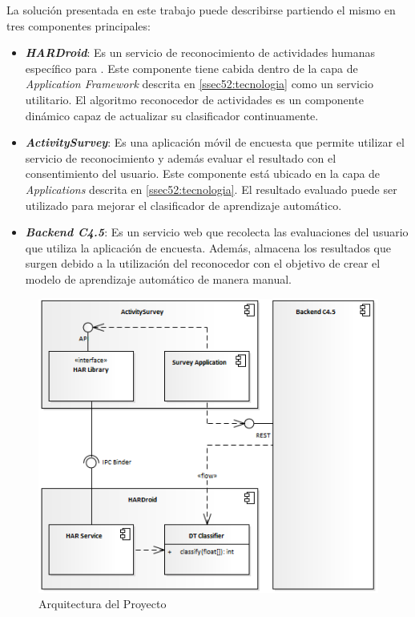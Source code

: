 \label{sec53:arquitectura}La solución presentada en este trabajo
puede describirse partiendo el mismo en tres componentes principales:
\begin{itemize}
\item \textbf{\emph{HARDroid}}: Es un servicio de reconocimiento de actividades
humanas específico para . Este componente tiene cabida
dentro de la capa de \emph{Application Framework} descrita en \ref{ssec52:tecnologia}
como un servicio utilitario. El algoritmo reconocedor de actividades
es un componente dinámico capaz de actualizar su clasificador continuamente.
\item \textbf{\emph{ActivitySurvey}}: Es una aplicación móvil de encuesta
que permite utilizar el servicio de reconocimiento y además evaluar
el resultado con el consentimiento del usuario. Este componente está
ubicado en la capa de \emph{Applications} descrita en \ref{ssec52:tecnologia}.
El resultado evaluado puede ser utilizado para mejorar el clasificador
de aprendizaje automático.
\item \textbf{\emph{Backend C4.5}}: Es un servicio web  que
recolecta las evaluaciones del usuario que utiliza la aplicación de
encuesta. Además, almacena los resultados que surgen debido a la utilización
del reconocedor con el objetivo de crear el modelo de aprendizaje
automático de manera manual. 
\end{itemize}
\begin{figure}[H]
\begin{centering}
\includegraphics[width=0.8\columnwidth]{capitulo-5/graphics/arqui_general}
\par\end{centering}
\caption[Arquitectura del Proyecto]{\label{fig5:arqui-general}Arquitectura del Proyecto}

\end{figure}

